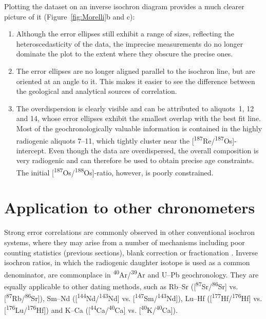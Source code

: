 \documentclass[]{article}
\begin{document}
Plotting the \citet{morelli2007} dataset on an inverse isochron
diagram provides a much clearer picture of it
(Figure~\ref{fig:Morelli}b and c):

\begin{enumerate}
\item Although the error ellipses still exhibit a range of sizes,
  reflecting the heteroscedasticity of the data, the imprecise
  measurements do no longer dominate the plot to the extent where they
  obscure the precise ones.
\item The error ellipses are no longer aligned parallel to the
  isochron line, but are oriented at an angle to it. This makes it
  easier to see the difference between the geological and analytical
  sources of correlation.
\item The overdispersion is clearly visible and can be attributed to
  aliquots~1, 12 and 14, whose error ellipses exhibit the smallest
  overlap with the best fit line. Most of the geochronologically
  valuable information is contained in the highly radiogenic aliquots
  7--11, which tightly cluster near the
  [\textsuperscript{187}Re/\textsuperscript{187}Os]-intercept.  Even
  though the data are overdispersed, the overall composition is very
  radiogenic and can therefore be used to obtain precise age
  constraints. The initial
  [\textsuperscript{187}Os/\textsuperscript{188}Os]-ratio, however, is
  poorly constrained.
\end{enumerate}

\section{Application to other chronometers}

Strong error correlations are commonly observed in other conventional
isochron systems, where they may arise from a number of mechanisms
including poor counting statistics (previous sections), blank
correction \citep[e.g.,][]{vermeesch2015b, connelly2017} or
fractionation \citep[e.g.,][]{ludwig1980}.  Inverse isochron ratios,
in which the radiogenic daughter isotope is used as a common
denominator, are commonplace in
\textsuperscript{40}Ar/\textsuperscript{39}Ar \citep{turner1971} and
U--Pb \citep{tera1972} geochronology. They are equally applicable to
other dating methods, such as Rb--Sr
([\textsuperscript{87}Sr/\textsuperscript{86}Sr] vs.
[\textsuperscript{87}Rb/\textsuperscript{86}Sr]), Sm--Nd
([\textsuperscript{144}Nd/\textsuperscript{143}Nd] vs.
[\textsuperscript{147}Sm/\textsuperscript{143}Nd]), Lu--Hf
([\textsuperscript{177}Hf/\textsuperscript{176}Hf] vs.
[\textsuperscript{176}Lu/\textsuperscript{176}Hf]) and K--Ca
([\textsuperscript{44}Ca/\textsuperscript{40}Ca] vs.
[\textsuperscript{40}K/\textsuperscript{40}Ca]).
\end{document}
